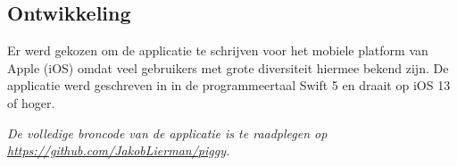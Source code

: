 
\subsection{Ontwikkeling}
\label{sec:applicatie:ontwikkeling}

Er werd gekozen om de applicatie te schrijven voor het mobiele platform van Apple (iOS) omdat veel gebruikers met grote diversiteit hiermee bekend zijn. De applicatie werd geschreven in in de programmeertaal Swift 5 en draait op iOS 13 of hoger.

\textit{De volledige broncode van de applicatie is te raadplegen op \url{https://github.com/JakobLierman/piggy}.}


